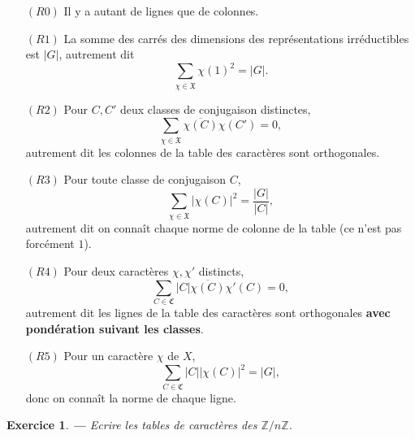 \documentclass[a4paper]{article}
\newcounter{question}
\newtheorem{enonce}{Exercice}
\newenvironment{exo}[0]{\begin{enonce}{\bf ---}\rm\setcounter{question}{1}}{\end{enonce}}
\theoremstyle{definition} %
\theoremstyle{plain} %
\theoremstyle{remark} %
\begin{document}
\begin{itemize}
	\item[$(R0)$] Il y a autant de lignes que de colonnes.
	
	\item[$(R1)$] La somme des carrés des dimensions des représentations irréductibles est $|G|$, autrement dit 
	\[
	\sum_{\chi \in \mathfrak{X}} \chi(1)^2 = |G|.
	\]
	\item[$(R2)$] Pour $C,C'$ deux classes de conjugaison distinctes,
	\[
	\sum_{\chi \in \mathfrak{X}} \overline{\chi(C)} \chi(C') = 0,
	\]
	autrement dit les colonnes de la table des caractères sont orthogonales.
	\item[$(R3)$] Pour toute classe de conjugaison $C$, 
	\[
	\sum_{\chi \in \mathfrak{X}} |\chi(C)|^2 = \frac{|G|}{|C|},
	\]
	autrement dit on connaît chaque norme de colonne de la table (ce n'est pas forcément $1$).
	
	\item[$(R4)$] Pour deux caractères $\chi,\chi'$ distincts, 
	\[
	\sum_{C \in \mathfrak{C}} |C| \overline{\chi(C)} \chi'(C) = 0,
	\]
	autrement dit les lignes de la table des caractères sont orthogonales {\bf avec pondération suivant les classes}.
	
	\item[$(R5)$] Pour un caractère $\chi$ de $X$, 
	\[
	\sum_{C \in \mathfrak{C}} |C| |\chi(C)|^2 = |G|,
	\]
	donc on connaît la norme de chaque ligne.
	
	
\end{itemize}

\begin{exo}
	Ecrire les tables de caractères des $\mathbb{Z}/n\mathbb{Z}$.
\end{exo}
\end{document}
